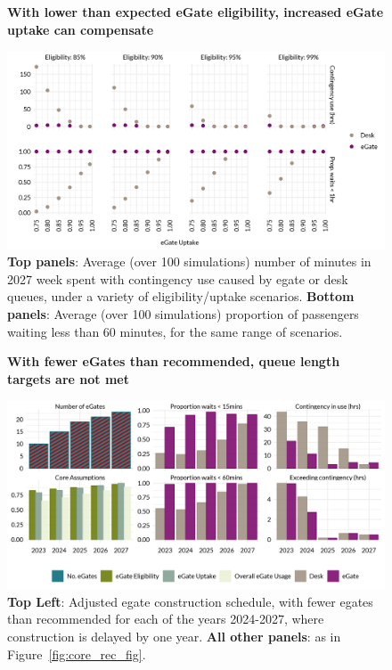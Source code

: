 \documentclass[10pt]{article}
\newcommand*{\figuretitle}[1]{%
    {\centering%
    \textbf{#1}%
    \par\medskip}%
}
\begin{document}
\begin{figure}[!ht]
    \centering
    \figuretitle{With lower than expected eGate eligibility, increased eGate uptake can compensate}
    \includegraphics[width=\textwidth]{figures/robustness_fig.png}
     \caption{\textbf{Top panels}: Average (over 100 simulations) number of minutes in 2027 week spent with contingency use caused by \gls{egate} or desk queues, under a variety of eligibility/uptake scenarios. \textbf{Bottom panels}: Average (over 100 simulations) proportion of passengers waiting less than 60 minutes, for the same range of scenarios.} \label{fig:robustness_fig}
\end{figure}

\begin{figure}[!h]
    \centering
    \figuretitle{With fewer eGates than recommended, queue length targets are not met}
    \includegraphics[width=\textwidth]{figures/minus_core_rec_fig.png}
     \caption{\textbf{Top Left}: Adjusted \gls{egate} construction schedule, with fewer \glspl{egate} than recommended for each of the years 2024-2027, where construction is delayed by one year. \textbf{All other panels}: as in Figure~\ref{fig:core_rec_fig}.} \label{fig:minus_core_rec_fig}
\end{figure}
\end{document}
